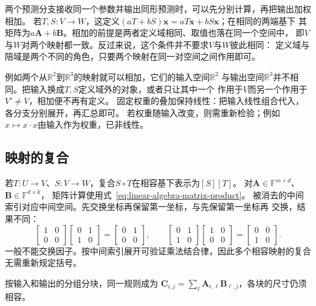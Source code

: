 两个预测分支接收同一个参数并输出同形预测时，可以先分别计算，再把输出加权相加。
若$T,S:V\to W$，这定义$(aT+bS)\bm x=aT\bm x+bS\bm x$；在相同的两端基下
其矩阵为$a\bm A+b\bm B$。相加的前提是两者定义域相同、取值也落在同一个空间中，
即$V$与$W$对两个映射都一致。反过来说，这个条件并不要求$V$与$W$彼此相同：
定义域与陪域是两个不同的角色，只要两个映射在同一对空间之间作用即可。

例如两个从$\mathbb R^2$到$\mathbb R^3$的映射就可以相加，它们的输入空间$\mathbb R^2$
与输出空间$\mathbb R^3$并不相同。把输入换成$T,S$定义域外的对象，或者只让其中一个
作用于$V$而另一个作用于$V'\neq V$，相加便不再有定义。
固定权重的叠加保持线性：把输入线性组合代入，各分支分别展开，再汇总即可。
若权重随输入改变，则需重新检验；例如$x\mapsto x\cdot x$由输入作为权重，已非线性。

\subsection{映射的复合}
\label{sec:linear-algebra-map-composition}

若$T:U\to V$、$S:V\to W$，复合$S\circ T$在相容基下表示为$[S][T]$。
对$\bm A\in\mathbb F^{m\times d}$、$\bm B\in\mathbb F^{d\times k}$，
矩阵计算使用式~\eqref{eq:linear-algebra-matrix-product}。
被消去的中间索引对应中间空间。先交换坐标再保留第一坐标，与先保留第一坐标再
交换，结果不同：
\[
 \begin{bmatrix}1&0\\0&0\end{bmatrix}\begin{bmatrix}0&1\\1&0\end{bmatrix}
 =\begin{bmatrix}0&1\\0&0\end{bmatrix},\qquad
 \begin{bmatrix}0&1\\1&0\end{bmatrix}\begin{bmatrix}1&0\\0&0\end{bmatrix}
 =\begin{bmatrix}0&0\\1&0\end{bmatrix}.
\]
一般不能交换因子。按中间索引展开可验证乘法结合律，因此多个相容映射的复合无需重新规定括号。

按输入和输出的分组分块，同一规则成为
$\bm C_{i,j}=\sum_\ell\bm A_{i,\ell}\bm B_{\ell,j}$，各块的尺寸仍须相容。


